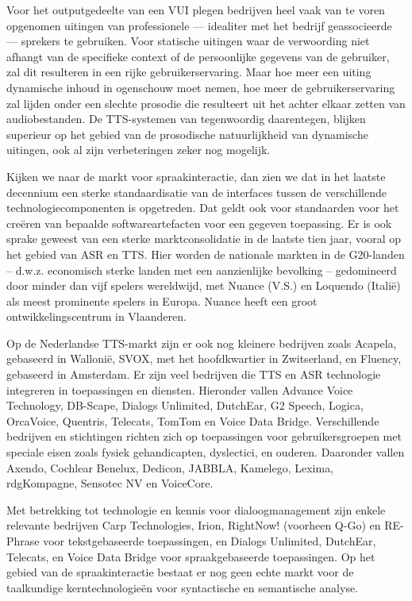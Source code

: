 \documentclass[]{../../metanetpaper}
\begin{document}
\begin{multicols}{2}
    Voor het outputgedeelte van een VUI plegen bedrijven heel vaak van te voren opgenomen uitingen van professionele --- idealiter met het bedrijf geassocieerde --- sprekers te gebruiken. Voor statische uitingen waar de verwoording niet afhangt van de specifieke context of de persoonlijke gegevens van de gebruiker, zal dit resulteren in een rijke gebruikerservaring. Maar hoe meer een uiting dynamische inhoud in ogenschouw moet nemen, hoe meer de gebruikerservaring zal lijden onder een slechte prosodie die resulteert uit het achter elkaar zetten van audiobestanden. De TTS-systemen van tegenwoordig daarentegen, blijken superieur op het gebied van de prosodische natuurlijkheid van dynamische uitingen, ook al zijn verbeteringen zeker nog mogelijk.

    Kijken we naar de markt voor spraakinteractie, dan zien we dat in het laatste decennium een sterke standaardisatie van de interfaces tussen de verschillende technologiecomponenten is opgetreden. Dat geldt ook voor standaarden voor het cre{\"e}ren van bepaalde softwareartefacten voor een gegeven toepassing. Er is ook sprake geweest van een sterke marktconsolidatie in de laatste tien jaar, vooral op het gebied van ASR en TTS. Hier worden de nationale markten in de G20-landen -- d.w.z. economisch sterke landen met een aanzienlijke bevolking -- gedomineerd door minder dan vijf spelers wereldwijd, met Nuance (V.S.) en Loquendo (Itali{\"e}) als meest prominente spelers in Europa. Nuance heeft een groot ontwikkelingscentrum in Vlaanderen.

    Op de Nederlandse TTS-markt zijn er ook nog kleinere bedrijven zoals Acapela, gebaseerd in Walloni{\"e}, SVOX, met het hoofdkwartier in Zwitserland, en Fluency, gebaseerd in Amsterdam. Er zijn veel bedrijven die TTS en ASR technologie integreren in toepassingen en diensten. Hieronder vallen Advance Voice Technology, DB-Scape, Dialogs Unlimited, DutchEar,   G2 Speech,  Logica, OrcaVoice, Quentris, Telecats, TomTom en Voice Data Bridge. Verschillende bedrijven en stichtingen richten zich op toepassingen voor gebruikersgroepen met speciale eisen zoals fysiek gehandicapten, dyslectici, en ouderen. Daaronder vallen Axendo, Cochlear Benelux, Dedicon, JABBLA, Kamelego, Lexima, rdgKompagne, Sensotec NV en VoiceCore.

    Met betrekking tot technologie en kennis voor dialoogmanagement zijn enkele relevante bedrijven Carp Technologies, Irion, RightNow! (voorheen Q-Go) en  RE-Phrase voor tekstgebaseerde toepassingen, en  Dialogs Unlimited, DutchEar, Telecats, en Voice Data Bridge  voor spraakgebaseerde toepassingen. Op het gebied van de spraakinteractie bestaat er nog geen echte markt voor de taalkundige kerntechnologie{\"e}n voor syntactische en semantische analyse.


\end{multicols}
\end{document}
